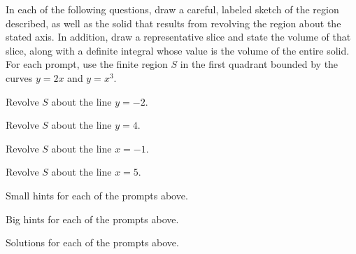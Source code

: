 \begin{activity} \label{A:6.1.3}  In each of the following questions, draw a careful, labeled sketch of the region described, as well as the solid that results from revolving the region about the stated axis.  In addition, draw a representative slice and state the volume of that slice, along with a definite integral whose value is the volume of the entire solid.  For each prompt, use the finite region $S$ in the first quadrant bounded by the curves $y = 2x$ and $y = x^3$.
\ba
	\item Revolve $S$ about the line $y = -2$.	
	\item Revolve $S$ about the line $y = 4$.
	\item Revolve $S$ about the line $x=-1$.	
	\item Revolve $S$ about the line $x = 5$.
\ea

\end{activity}
\begin{smallhint}
\ba
	\item Small hints for each of the prompts above.
\ea
\end{smallhint}
\begin{bighint}
\ba
	\item Big hints for each of the prompts above.
\ea
\end{bighint}
\begin{activitySolution}
\ba
	\item Solutions for each of the prompts above.
\ea
\end{activitySolution}
\aftera
